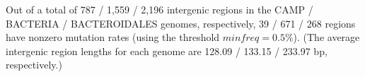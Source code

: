 Out of a total of 787 / 1,559 / 2,196 intergenic regions in the CAMP / BACTERIA / BACTEROIDALES genomes, respectively, 39 / 671 / 268 regions have nonzero mutation rates (using the threshold $minfreq=0.5\%$). (The average intergenic region lengths for each genome are 128.09 / 133.15 / 233.97 bp, respectively.)\endinput